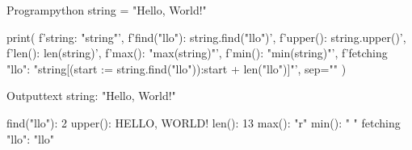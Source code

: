 \documentclass[11pt]{ipu-python}
\begin{document}
    \maketitle

    \vspace*{10pt}
    \begin{code}
        {Program}{python}
string = "Hello, World!"

print(
    f'string: "{string}"\n',
    f'find("llo"): {string.find("llo")}',
    f'upper(): {string.upper()}',
    f'len(): {len(string)}',
    f'max(): "{max(string)}"',
    f'min(): "{min(string)}"',
    f'fetching "llo": "{string[(start := string.find("llo")):start + len("llo")]}"',
    sep="\n"
)
    \end{code}
    \begin{code}
        {Output}{text}
string: "Hello, World!"

find("llo"): 2
upper(): HELLO, WORLD!
len(): 13
max(): "r"
min(): " "
fetching "llo": "llo"
    \end{code}
\end{document}
